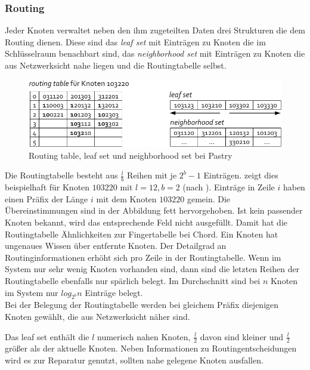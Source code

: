 \subsubsection*{Routing}
Jeder Knoten verwaltet neben den ihm zugeteilten Daten drei Strukturen die dem Routing dienen. Diese sind das \emph{leaf set} mit Einträgen zu Knoten die im Schlüsselraum benachbart sind, das \emph{neighborhood set} mit Einträgen zu Knoten die aus Netzwerksicht nahe liegen und die Routingtabelle selbst.

\begin{figure}[htbp]
\centering
\includegraphics{grafics/pastry_routing_table.pdf}
\caption{Routing table, leaf set und neighborhood set bei Pastry}
\label{fig:pastry_routing_table}
\end{figure}

Die Routingtabelle besteht aus $\frac{l}{b}$ Reihen mit je $2^b -1$ Einträgen.  zeigt dies beispielhaft für Knoten $103220$ mit $l=12, b=2$ (nach \cite{Goetz2005}). Einträge in Zeile $i$ haben einen Präfix der Länge $i$ mit dem Knoten $103220$ gemein. Die Übereinstimmungen sind in der Abbildung fett hervorgehoben. Ist kein passender Knoten bekannt, wird das entsprechende Feld nicht ausgefüllt. Damit hat die Routingtabelle Ähnlichkeiten zur Fingertabelle bei Chord. Ein Knoten hat ungenaues Wissen über entfernte Knoten. Der Detailgrad an Routinginformationen erhöht sich pro Zeile in der Routingtabelle. Wenn im System nur sehr wenig Knoten vorhanden sind, dann sind die letzten Reihen der Routingtabelle ebenfalls nur spärlich belegt. Im Durchschnitt sind bei $n$ Knoten im System nur $log_{2^b} n$ Einträge belegt.\\
Bei der Belegung der Routingtabelle werden bei gleichem Präfix diejenigen Knoten gewählt, die aus Netzwerksicht näher sind.

Das leaf set enthält die $l$ numerisch nahen Knoten, $\frac{l}{2}$ davon sind kleiner und $\frac{l}{2}$ größer als der aktuelle Knoten. Neben Informationen zu Routingentscheidungen wird es zur Reparatur genutzt, sollten nahe gelegene Knoten ausfallen.

